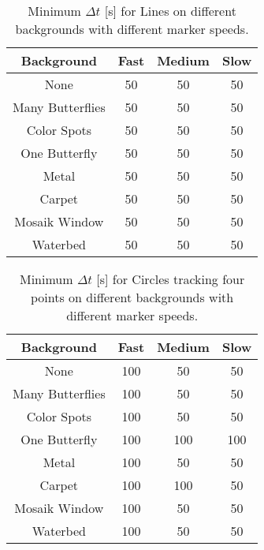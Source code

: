 \begin{table}[H]
\center
\begin{tabular}{|c|c|c|c|}
\hline
Background        & Fast & Medium & Slow \\ \hline
None & 50 & 50 & 50\\ \hline 
Many Butterflies & 50 & 50 & 50\\ \hline 
Color Spots & 50 & 50 & 50\\ \hline 
One Butterfly & 50 & 50 & 50\\ \hline 
Metal & 50 & 50 & 50\\ \hline 
Carpet & 50 & 50 & 50\\ \hline 
Mosaik Window & 50 & 50 & 50\\ \hline 
Waterbed & 50 & 50 & 50\\ \hline 
\end{tabular}
\caption{Minimum $\Delta t$ [s] for Lines on different backgrounds with different marker speeds.}
 \label{tb:min_dt_lines}
\end{table}

\begin{table}[H]
\center
\begin{tabular}{|c|c|c|c|}
\hline
Background       & Fast & Medium & Slow \\ \hline
None & 100 & 50 & 50\\ \hline 
Many Butterflies & 100 & 50 & 50\\ \hline 
Color Spots & 100 & 50 & 50\\ \hline 
One Butterfly & 100 & 100 & 100\\ \hline 
Metal & 100 & 50 & 50\\ \hline 
Carpet & 100 & 100 & 50\\ \hline 
Mosaik Window & 100 & 50 & 50\\ \hline 
Waterbed & 100 & 50 & 50\\ \hline 
\end{tabular}
\caption{Minimum $\Delta t$ [s] for Circles tracking four points on different backgrounds with different marker speeds.}
\label{tb:min_dt_circles}
\end{table}

